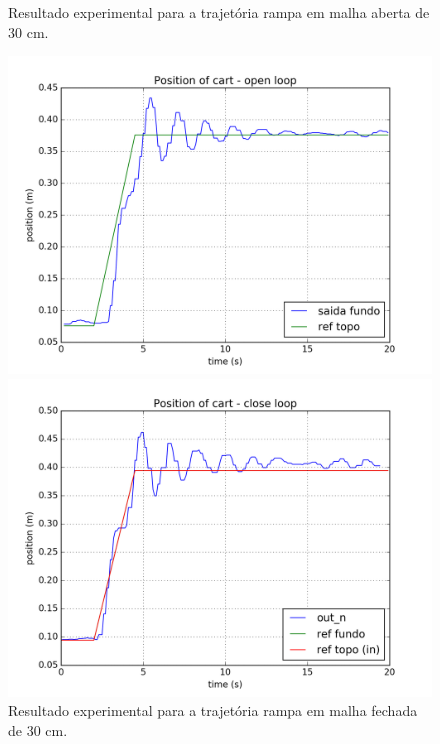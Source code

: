 \begin{figure}[!ht]
\centering
\begin{minipage}{0.45\textwidth}
\centering
\caption{Resultado experimental para a trajetória rampa em malha aberta de 30 cm. \label{malhaAbertaRampa}}
\includegraphics[width=1\linewidth]{figs/resultados/experimento/open_loop_ramp}
\end{minipage}
\hspace{0.1cm}
\begin{minipage}{0.45\textwidth}
\centering
\caption{Resultado experimental para a trajetória rampa em malha fechada de 30 cm. \label{malhaFechadaRampa}}
\includegraphics[width=1\linewidth]{figs/resultados/experimento/closed_loop_trajetoria_rampa}
\end{minipage}
\end{figure}

